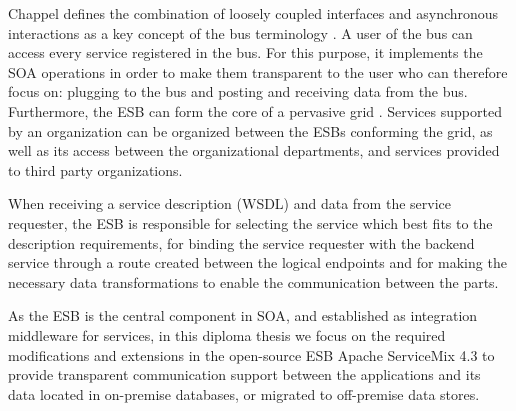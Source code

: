 Chappel defines the combination of loosely coupled interfaces and asynchronous interactions as a key concept of the bus terminology  \cite{Chapp2004}. A user of the bus can access every service registered in the bus. For this purpose, it implements the \ac{SOA} operations in order to make them transparent to the user who can therefore focus on: plugging to the bus and posting and receiving data from the bus. Furthermore, the \ac{ESB} can form the core of a pervasive grid \cite{Chapp2004}. Services supported by an organization can be organized between the \ac{ESB}s conforming the grid, as well as its access between the organizational departments, and services provided to third party organizations. 



When receiving a service description (\ac{WSDL}) and data from the service requester, the \ac{ESB} is responsible for selecting the service which best fits to the description requirements, for binding the service requester with the backend service through a route created between the logical endpoints and for making the necessary data transformations to enable the communication between the parts.

As the \ac{ESB} is the central component in \ac{SOA}, and established as integration middleware for services, in this diploma thesis we focus on the required modifications and extensions in the open-source \ac{ESB} Apache ServiceMix 4.3 to provide transparent communication support between the applications and its data located in on-premise databases, or migrated to off-premise data stores. 

\FloatBarrier